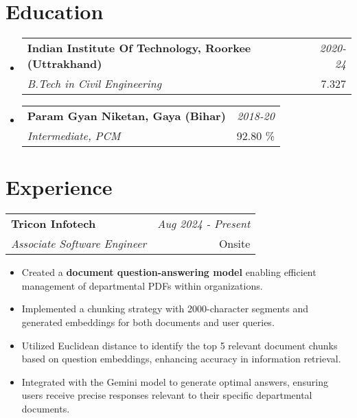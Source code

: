 \documentclass[a4paper,11pt]{article}
\makeatletter
\newcommand{\resumeSubheading}[4]{
\vspace{0.5mm}\item
    \begin{tabular*}{0.98\textwidth}[t]{l@{\extracolsep{\fill}}r}
        \textbf{#1} & \textit{\footnotesize{#4}} \\
        \textit{\footnotesize{#3}} &  \footnotesize{#2}\\
    \end{tabular*}
    \vspace{-2.4mm}
}
\newcommand{\resumeSubHeadingListStart}{\begin{itemize}[leftmargin=*,labelsep=0mm]}
\newcommand{\resumeItemListStart}{\begin{justify}\begin{itemize}[leftmargin=3ex, rightmargin=2ex, noitemsep,labelsep=1.2mm,itemsep=0mm]\small}
\newcommand{\resumeSubHeadingListEnd}{\end{itemize}\vspace{2mm}}
\newcommand{\resumeItemListEnd}{\end{itemize}\end{justify}\vspace{-2mm}}
\makeatother
\begin{document}


  


\section{\textbf{Education}}
  \resumeSubHeadingListStart
    \resumeSubheading
         {Indian Institute Of Technology, Roorkee (Uttrakhand) }{ 7.327}
        {B.Tech in Civil Engineering}{2020-24}
    
        \resumeSubheading
        {Param Gyan Niketan, Gaya (Bihar) }{ 92.80 \%}
        {Intermediate, PCM}{2018-20}


     
  \resumeSubHeadingListEnd
\vspace{-5.5mm}
%

\section{\textbf{Experience}}
 \resumeSubheading
      {Tricon Infotech}{Onsite}
      {Associate Software Engineer} {Aug 2024 - Present}
      \resumeItemListStart
   
    \item { Created a \textbf{document question-answering model} enabling efficient management of departmental PDFs within organizations.}
    
    \item { Implemented a chunking strategy with 2000-character segments and generated embeddings for both documents and user queries.}
    \item {Utilized Euclidean distance to identify the top 5 relevant document chunks based on question embeddings, enhancing accuracy in information retrieval.}
    \item { Integrated with the Gemini model to generate optimal answers, ensuring users receive precise responses relevant to their specific departmental documents.}
    \resumeItemListEnd
    \vspace{0.1 mm}
\end{document}

